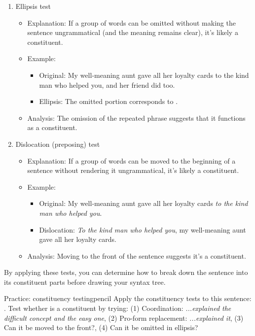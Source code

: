 \begin{enumerate}[noitemsep]
    \item Ellipsis test
    \begin{itemize}[noitemsep]
        \item Explanation: If a group of words can be omitted without making the sentence ungrammatical (and the meaning remains clear), it's likely a constituent.
        \item Example:
        \begin{itemize}[noitemsep]
            \item Original: My well-meaning aunt gave all her loyalty cards to the kind man who helped you, and her friend did too.
            \item Ellipsis: The omitted portion corresponds to .
        \end{itemize}
        \item Analysis: The omission of the repeated phrase suggests that it functions as a constituent.
    \end{itemize}
    
    \item Dislocation (preposing) test
    \begin{itemize}[noitemsep]
        \item Explanation: If a group of words can be moved to the beginning of a sentence without rendering it ungrammatical, it's likely a constituent.
        \item Example:
        \begin{itemize}[noitemsep]
            \item Original: My well-meaning aunt gave all her loyalty cards \emph{to the kind man who helped you}.
            \item Dislocation: \emph{To the kind man who helped you}, my well-meaning aunt gave all her loyalty cards.
        \end{itemize}
        \item Analysis: Moving  to the front of the sentence suggests it's a constituent.
    \end{itemize}
\end{enumerate}

By applying these tests, you can determine how to break down the sentence into its constituent parts before drawing your syntax tree.

\begin{tblsframedsymbol}{Practice: constituency testing}{pencil}
Apply the constituency tests to this sentence: . Test whether  is a constituent by trying: (1) Coordination: \textit{...explained \emph{the difficult concept} and \emph{the easy one}}, (2) Pro-form replacement: \textit{...explained \emph{it}}, (3) Can it be moved to the front?, (4) Can it be omitted in ellipsis?
\end{tblsframedsymbol}

